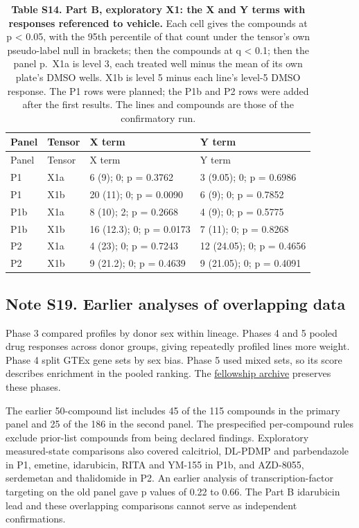 \documentclass[
  11pt,
  letterpaper,
]{article}
\begin{document}
\begin{longtable}[]{@{}llll@{}}
\caption{\textbf{Table S14. Part B, exploratory X1: the X and Y terms
with responses referenced to vehicle.} Each cell gives the compounds at
p \textless{} 0.05, with the 95th percentile of that count under the
tensor's own pseudo-label null in brackets; then the compounds at q
\textless{} 0.1; then the panel p.~X1a is level 3, each treated well
minus the mean of its own plate's DMSO wells. X1b is level 5 minus each
line's level-5 DMSO response. The P1 rows were planned; the P1b and P2
rows were added after the first results. The lines and compounds are
those of the confirmatory run.}\tabularnewline
\toprule\noalign{}
Panel & Tensor & X term & Y term \\
\midrule\noalign{}
\endfirsthead
\toprule\noalign{}
Panel & Tensor & X term & Y term \\
\midrule\noalign{}
\endhead
\bottomrule\noalign{}
\endlastfoot
P1 & X1a & 6 (9); 0; p = 0.3762 & 3 (9.05); 0; p = 0.6986 \\
P1 & X1b & 20 (11); 0; p = 0.0090 & 6 (9); 0; p = 0.7852 \\
P1b & X1a & 8 (10); 2; p = 0.2668 & 4 (9); 0; p = 0.5775 \\
P1b & X1b & 16 (12.3); 0; p = 0.0173 & 7 (11); 0; p = 0.8268 \\
P2 & X1a & 4 (23); 0; p = 0.7243 & 12 (24.05); 0; p = 0.4656 \\
P2 & X1b & 9 (21.2); 0; p = 0.4639 & 9 (21.05); 0; p = 0.4091 \\
\end{longtable}

\subsection{Note S19. Earlier analyses of overlapping
data}\label{note-s19.-earlier-analyses-of-overlapping-data}

Phase 3 compared profiles by donor sex within lineage. Phases 4 and 5
pooled drug responses across donor groups, giving repeatedly profiled
lines more weight. Phase 4 split GTEx gene sets by sex bias. Phase 5
used mixed sets, so its score describes enrichment in the pooled
ranking. The
\href{https://github.com/MateenahJAHAN/Project-59-CMAP-Sex-Differences\#how-the-analysis-developed}{fellowship
archive} preserves these phases.

The earlier 50-compound list includes 45 of the 115 compounds in the
primary panel and 25 of the 186 in the second panel. The prespecified
per-compound rules exclude prior-list compounds from being declared
findings. Exploratory measured-state comparisons also covered
calcitriol, DL-PDMP and parbendazole in P1, emetine, idarubicin, RITA
and YM-155 in P1b, and AZD-8055, serdemetan and thalidomide in P2. An
earlier analysis of transcription-factor targeting on the old panel gave
p values of 0.22 to 0.66. The Part B idarubicin lead and these
overlapping comparisons cannot serve as independent confirmations.
\end{document}
